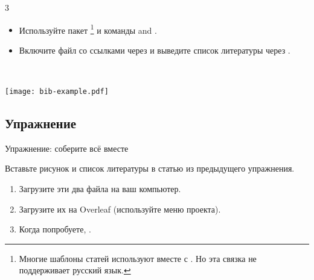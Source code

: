 \documentclass{beamer}
\begin{document}
\begin{frame}[fragile]{\insertsubsection{} 3}
\vspace{-3ex}
\small
\begin{itemize}
\item Используйте пакет \footnote{\scriptsize Многие шаблоны статей используют
 вместе с . Но эта связка не поддерживает русский язык.}
и команды  and .
\item Включите файл со ссылками через  и выведите список
литературы через .
\end{itemize}
\vspace{-2ex}
\begin{minipage}{0.55\linewidth}
\end{minipage}~~%
\begin{minipage}{0.45\linewidth}
\texttt{[image: bib-example.pdf]}
\end{minipage}
\end{frame}

\subsection{Упражнение}
\begin{frame}[fragile]{Упражнение: соберите всё вместе}

Вставьте рисунок и список литературы в статью из предыдущего упражнения.

\begin{enumerate}
\item Загрузите эти два файла на ваш компьютер.
\vspace{1ex}
\begin{center}

\end{center}

\vspace{1ex}
\item Загрузите их на Overleaf (используйте меню проекта).
\item Когда попробуете,
.
\end{enumerate}
\end{frame}
\end{document}
